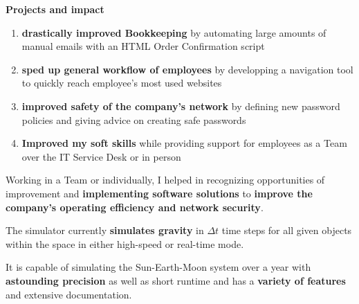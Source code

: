 \documentclass[]{jonas-cv}
\begin{document}
\hfill
\begin{minipage}[t]{0.63\textwidth} 



\sectionsep

\begin{tightemize}
    \item \textbf{Projects and impact}
    \begin{enumerate}
        \item \textbf{drastically improved Bookkeeping} by automating large amounts of manual emails with an HTML Order Confirmation script
        \item \textbf{sped up general workflow of employees} by developping a navigation tool to quickly reach employee's most used websites
        \item \textbf{improved safety of the company's network} by defining new password policies and giving advice on creating safe passwords
        \item \textbf{Improved my soft skills} while providing support for employees as a Team over the IT Service Desk or in person
    \end{enumerate}
    \vspace{2mm}

    \item [\faicon{angle-double-right}] Working in a Team or individually, I helped in recognizing opportunities of improvement
    and \textbf{implementing software solutions} to \textbf{improve the company's operating efficiency and network security}.
\end{tightemize}
\largesectionsep




\begin{tightemize}
    \item The simulator currently \textbf{simulates gravity} in $\Delta t$ time steps for all given objects within the space in either high-speed or real-time mode.
    \item It is capable of simulating the Sun-Earth-Moon system over a year with \textbf{astounding precision} as well as short runtime and has a \textbf{variety of features} and extensive documentation.
    \vspace{2mm}


\end{tightemize}
\end{minipage}
\end{document}
